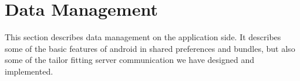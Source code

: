 \section{Data Management}
\label{sec:datam}

This section describes data management on the application side. It describes some of the basic features of android in shared preferences and bundles, but also some of the tailor fitting server communication we have designed and implemented.


